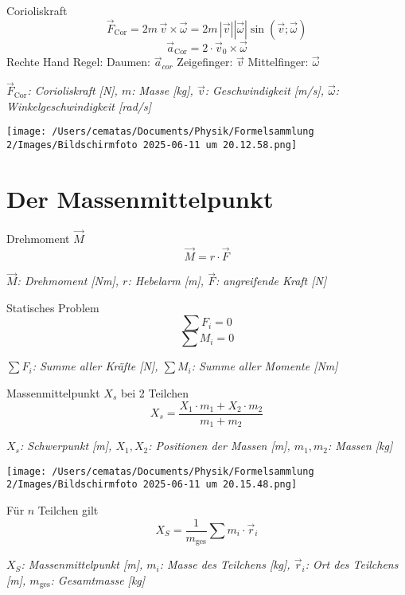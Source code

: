 \documentclass[a4paper,10pt]{article}
\newenvironment{displayformula}
{
	\begin{framed}
		\color{formulaColor}
	}
	{\end{framed}}
\newcommand{\formulalegend}[1]{%
	\par\vspace{0.5ex}%
	{{\color{legendColor}\RaggedRight\small\textit{#1}}}%
	\par\vspace{1.5ex}%
}
\begin{document}
\begin{displayformula}
	Corioliskraft
	\[
	\vec{F}_{\mathrm{Cor}} = 2m\, \vec{v} \times \vec{\omega} = 2m\, | \vec{v} | | \vec{\omega} | \sin(\vec{v}; \vec{\omega})
	\]
	\[
	\vec{a}_{\mathrm{Cor}} = 2 \cdot \vec{v}_0 \times \vec{\omega}
	\]
	Rechte Hand Regel: Daumen: $\vec{a}_{cor}$ Zeigefinger: $\vec{v}$ Mittelfinger: $\vec{\omega}$
\end{displayformula}
\formulalegend{
	\( \vec{F}_{\mathrm{Cor}} \): Corioliskraft [N], \( m \): Masse [kg], \( \vec{v} \): Geschwindigkeit [m/s], \( \vec{\omega} \):  Winkelgeschwindigkeit [rad/s]
}

\texttt{[image: /Users/cematas/Documents/Physik/Formelsammlung 2/Images/Bildschirmfoto 2025-06-11 um 20.12.58.png]}

\newpage


\section{Der Massenmittelpunkt}

\begin{displayformula}
	Drehmoment \( \vec{M} \)
	\[
	\vec{M} = r \cdot \vec{F}
	\]
\end{displayformula}
\formulalegend{
	\( \vec{M} \): Drehmoment [Nm], \( r \): Hebelarm [m], \( \vec{F} \): angreifende Kraft [N]
}

\begin{displayformula}
	Statisches Problem
	\[
	\sum F_i = 0
	\]
	\[
	\sum M_i = 0
	\]
\end{displayformula}
\formulalegend{
	\( \sum F_i \): Summe aller Kräfte [N], \( \sum M_i \): Summe aller Momente [Nm]
}

\begin{displayformula}
	Massenmittelpunkt \( X_s \) bei 2 Teilchen
	\[
	X_s = \frac{X_1 \cdot m_1 + X_2 \cdot m_2}{m_1 + m_2}
	\]
\end{displayformula}
\formulalegend{
	\( X_s \): Schwerpunkt [m], \( X_1, X_2 \): Positionen der Massen [m], \( m_1, m_2 \): Massen [kg]
}

\texttt{[image: /Users/cematas/Documents/Physik/Formelsammlung 2/Images/Bildschirmfoto 2025-06-11 um 20.15.48.png]}
\begin{displayformula}
	Für \( n \) Teilchen gilt
	\[
	X_S = \frac{1}{m_{\text{ges}}} \sum m_i \cdot \vec{r}_i
	\]
\end{displayformula}
\formulalegend{
	\( X_S \): Massenmittelpunkt [m], \( m_i \): Masse des Teilchens [kg], \( \vec{r}_i \): Ort des Teilchens [m], \( m_{\text{ges}} \): Gesamtmasse [kg]
}
\end{document}
